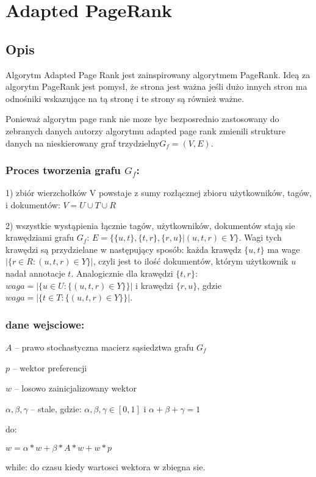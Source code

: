 \chapter{Adapted PageRank}
\section{Opis}

Algorytm Adapted Page Rank jest zainspirowany algorytmem PageRank. Ideą za algorytm PageRank jest pomysł, że strona jest ważna jeśli dużo innych stron ma odnośniki wskazujące na tą stronę i te strony są również ważne.

Ponieważ algorytm page rank nie moze byc bezposrednio zastosowany do zebranych danych autorzy algorytmu adapted page rank zmienili strukture danych na nieskierowany graf trzydzielny$ G_f = (V,E)$.

\subsection*{Proces tworzenia grafu $G_f$:}

1) zbiór wierzchołków V powstaje z sumy rozłącznej zbioru użytkowników, tagów, i dokumentów: $V = U \cup T \cup R$

2) wszystkie wystąpienia łącznie tagów, użytkowników, dokumentów  stają sie krawędziami grafu $G_f$: $E = \{\{u,t\}, \{t,r\} ,\{r,u\} | (u,t,r) \in Y \}$. Wagi tych krawędzi są przydzielane w następujący sposób: każda krawędz $\{u,t\}$ ma wage $| \{r \in R : (u,t,r) \in Y\}|$, czyli jest to ilość dokumentów, którym użytkownik $u$ nadał annotacje $t$. Analogicznie dla krawędzi $\{t,r\}$: $waga=|\{u \in U : \{(u,t,r) \in Y\}\}|$ i krawędzi $\{r, u\}$, gdzie 
$waga=| \{t \in T : \{(u,t,r) \in Y \} \} |$.

\subsection*{dane wejsciowe:}
$A$ -- prawo stochastyczna macierz sąsiedztwa grafu $G_f$

$p$ -- wektor preferencji

$w$ -- losowo zainicjalizowany wektor

$\alpha, \beta, \gamma$ -- stale, gdzie: $\alpha, \beta, \gamma \in [0,1]$ i $\alpha + \beta + \gamma = 1$

do:

$w = \alpha * w + \beta * A * w + w * p$

while:
    do czasu kiedy wartosci wektora w zbiegna sie.

